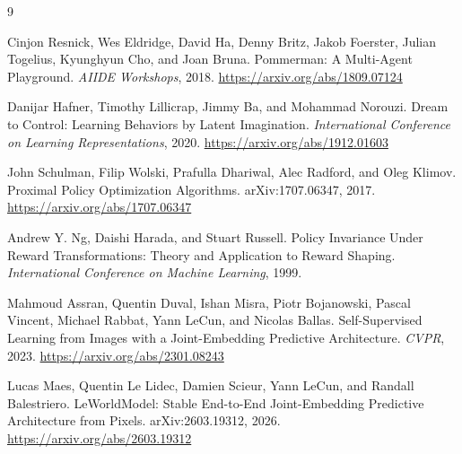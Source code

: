 \documentclass[11pt]{article}
\begin{document}
\begin{thebibliography}{9}

Cinjon Resnick, Wes Eldridge, David Ha, Denny Britz, Jakob Foerster, Julian Togelius, Kyunghyun Cho, and Joan Bruna.
\newblock Pommerman: A Multi-Agent Playground.
\newblock \emph{AIIDE Workshops}, 2018.
\newblock \url{https://arxiv.org/abs/1809.07124}

Danijar Hafner, Timothy Lillicrap, Jimmy Ba, and Mohammad Norouzi.
\newblock Dream to Control: Learning Behaviors by Latent Imagination.
\newblock \emph{International Conference on Learning Representations}, 2020.
\newblock \url{https://arxiv.org/abs/1912.01603}

John Schulman, Filip Wolski, Prafulla Dhariwal, Alec Radford, and Oleg Klimov.
\newblock Proximal Policy Optimization Algorithms.
\newblock arXiv:1707.06347, 2017.
\newblock \url{https://arxiv.org/abs/1707.06347}

Andrew Y. Ng, Daishi Harada, and Stuart Russell.
\newblock Policy Invariance Under Reward Transformations: Theory and Application to Reward Shaping.
\newblock \emph{International Conference on Machine Learning}, 1999.

Mahmoud Assran, Quentin Duval, Ishan Misra, Piotr Bojanowski, Pascal Vincent, Michael Rabbat, Yann LeCun, and Nicolas Ballas.
\newblock Self-Supervised Learning from Images with a Joint-Embedding Predictive Architecture.
\newblock \emph{CVPR}, 2023.
\newblock \url{https://arxiv.org/abs/2301.08243}

Lucas Maes, Quentin Le Lidec, Damien Scieur, Yann LeCun, and Randall Balestriero.
\newblock LeWorldModel: Stable End-to-End Joint-Embedding Predictive Architecture from Pixels.
\newblock arXiv:2603.19312, 2026.
\newblock \url{https://arxiv.org/abs/2603.19312}

\end{thebibliography}
\end{document}
